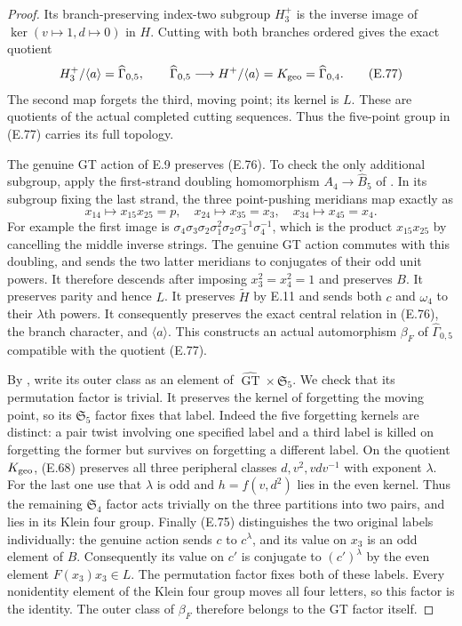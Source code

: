 \begin{proof}
Its branch-preserving index-two subgroup
$H_3^+$ is the inverse image of
$\ker(v\mapsto1,d\mapsto0)$ in $H$.
Cutting with both branches ordered gives
the exact quotient
\[
 H_3^+/\langle a\rangle=\widehat\Gamma_{0,5},
 \qquad
 \widehat\Gamma_{0,5}\longrightarrow
        H^+/\langle a\rangle
          =K_{\rm geo}=\widehat\Gamma_{0,4}.             \tag{E.77}
\]
The second map forgets the third, moving
point; its kernel is $L$.
These are quotients of the actual completed
cutting sequences.  Thus the five-point
group in (E.77) carries its full topology.

The genuine GT action of E.9 preserves
(E.76).  To check the only additional
subgroup, apply the first-strand doubling
homomorphism
$A_4\to\widehat B_5$ of
\cite[\S0.3, pp.~7--8]{ET_HS2000}.
In its subgroup fixing the last strand,
the three point-pushing meridians map exactly as
\[
 x_{14}\longmapsto x_{15}x_{25}=p,
 \quad x_{24}\longmapsto x_{35}=x_3,
 \quad x_{34}\longmapsto x_{45}=x_4.
\]
For example the first image is
$\sigma_4\sigma_3\sigma_2\sigma_1^2
\sigma_2\sigma_3^{-1}\sigma_4^{-1}$,
which is the product $x_{15}x_{25}$ by
cancelling the middle inverse strings.
The genuine GT action commutes
with this doubling, and sends the two latter
meridians to conjugates of their odd unit
powers.  It therefore descends after imposing
$x_3^2=x_4^2=1$ and preserves $B$.
It preserves parity and hence $L$.
It preserves $\widetilde H$ by E.11 and sends
both $c$ and $\omega_4$ to their
$\lambda$th powers.  It consequently preserves
the exact central relation in (E.76), the
branch character, and $\langle a\rangle$.
This constructs an actual automorphism
$\beta_F$ of $\widehat\Gamma_{0,5}$ compatible
with the quotient (E.77).

By \cite[Corollary 2.8(i)]{ET_HMM2022}, write
its outer class as an element of
$\widehat{\operatorname{GT}}\times\mathfrak S_5$.
We check that its permutation factor is
trivial.  It preserves the kernel of
forgetting the moving point, so its
$\mathfrak S_5$ factor fixes that label.
Indeed the five forgetting kernels are
distinct: a pair twist involving one
specified label and a third label is killed
on forgetting the former but survives on
forgetting a different label.
On the quotient $K_{\rm geo}$, (E.68)
preserves all three peripheral classes
$d,v^2,vdv^{-1}$ with exponent $\lambda$.
For the last one use that $\lambda$ is odd
and $h=f(v,d^2)$ lies in the even kernel.
Thus the remaining $\mathfrak S_4$ factor
acts trivially on the three partitions into
two pairs, and lies in its Klein four group.
Finally (E.75) distinguishes the two original
labels individually: the genuine action
sends $c$ to $c^\lambda$, and its value on
$x_3$ is an odd element of $B$.
Consequently its value on $c'$ is conjugate
to $(c')^\lambda$ by the even element
$F(x_3)x_3\in L$.
The permutation factor fixes both of these
labels.  Every nonidentity element of the
Klein four group moves all four letters,
so this factor is the identity.
The outer class of $\beta_F$ therefore
belongs to the GT factor itself.


\end{proof}
